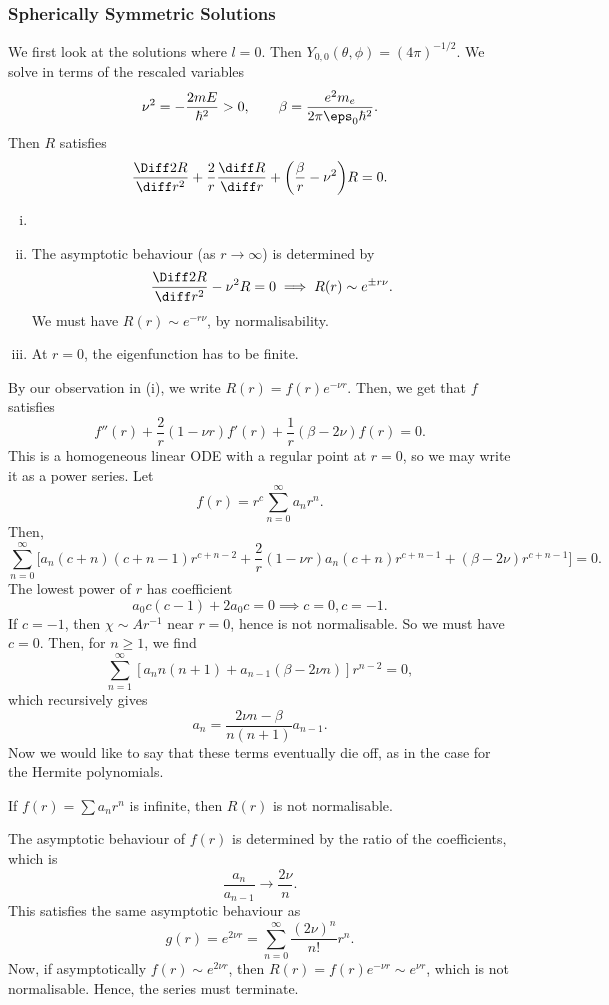 \documentclass[12pt]{article}
\begin{document}
\subsubsection{Spherically Symmetric Solutions}%
\label{subsub:spherically_symmetric_solutions}

We first look at the solutions where $l = 0$. Then $Y_{0,0}(\theta, \phi) = (4\pi)^{-1/2}$. We solve in terms of the rescaled variables
\[
\nu^2 = -\frac{2mE}{\hbar^2} > 0, \qquad \beta = \frac{e^2m_e}{2\pi\eps_0\hbar^2}
.\]
Then $R$ satisfies
\[
	\frac{\Diff2 R}{\diff r^2} + \frac{2}{r} \frac{\diff R}{\diff r} + \biggl( \frac{\beta}{r} - \nu^2 \biggr)R = 0
.\]
\begin{remark}
	\begin{enumerate}[(i)]
		\item[]
		\item The asymptotic behaviour (as $r\to \infty$) is determined by
			\[
				\frac{\Diff2R}{\diff r^2} - \nu^2 R = 0 \implies R(r) \sim e^{\pm r \nu}
			.\]
			We must have $R(r) \sim e^{-r \nu}$, by normalisability.
		\item At $r = 0$, the eigenfunction has to be finite.
	\end{enumerate}
\end{remark}
By our observation in (i), we write $R(r) = f(r) e^{- \nu r}$. Then, we get that $f$ satisfies
\[
	f''(r) + \frac{2}{r}(1 - \nu r)f'(r) + \frac{1}{r}(\beta - 2 \nu)f(r) = 0
.\]
This is a homogeneous linear ODE with a regular point at $r = 0$, so we may write it as a power series. Let
\[
	f(r) = r^{c} \sum_{n = 0}^{\infty} a_n r^{n}
.\]
Then,
\[
	\sum_{n = 0}^{\infty} \biggl[ a_n (c+n)(c+n-1)r^{c+n-2} + \frac{2}{r} (1 - \nu r) a_n (c+n) r^{c+n-1} + (\beta - 2 \nu) r^{c+n-1}\biggr] = 0
.\]
The lowest power of $r$ has coefficient
\[
	a_0 c(c-1) + 2 a_0 c = 0 \implies c = 0, c = -1
.\]
If $c = -1$, then $\chi \sim Ar^{-1}$ near $r = 0$, hence is not normalisable. So we must have $c = 0$. Then, for $n \geq 1$, we find
\[
	\sum_{n = 1}^{\infty} [a_n n(n+1) + a_{n-1}(\beta - 2 \nu n)]r^{n-2} = 0
,\]
which recursively gives
\[
	a_n = \frac{2 \nu n - \beta}{n(n+1)}a_{n-1}
.\]
Now we would like to say that these terms eventually die off, as in the case for the Hermite polynomials.

\begin{proposition}
	If $f(r) = \sum a_n r^{n}$ is infinite, then $R(r)$ is not normalisable.
\end{proposition}

\begin{proofbox}
	The asymptotic behaviour of $f(r)$ is determined by the ratio of the coefficients, which is
	\[
	\frac{a_n}{a_{n-1}} \to \frac{2 \nu}{n}
	.\]
	This satisfies the same asymptotic behaviour as
	\[
		g(r) = e^{2 \nu r} = \sum_{n = 0}^{\infty} \frac{(2 \nu)^{n}}{n!}r^{n}
	.\]
	Now, if asymptotically $f(r) \sim e^{2 \nu r}$, then $R(r) = f(r) e^{- \nu r} \sim e^{\nu r}$, which is not normalisable. Hence, the series must terminate.
\end{proofbox}
\end{document}
